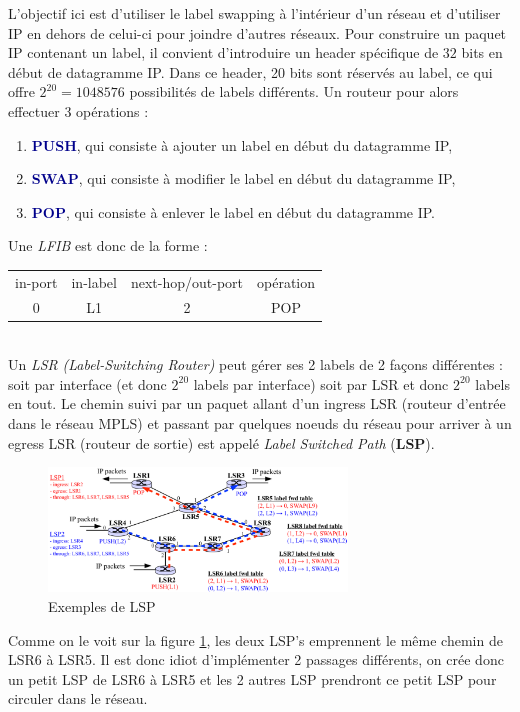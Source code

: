 \documentclass{article}
\newcommand{\blu}[1]{\textcolor{darkblue}{#1}}
\newcommand{\term}[1]{\textit{\textcolor{maintitle}{#1}}}
\begin{document}
\begin{sffamily}
L'objectif ici est d'utiliser le label swapping à l'intérieur d'un réseau et d'utiliser IP en dehors de celui-ci pour joindre 
d'autres réseaux. Pour construire un paquet IP contenant un label, il convient d'introduire un header spécifique de $32$ bits en 
début de datagramme IP. Dans ce header, 20 bits sont réservés au label, ce qui offre $2^{20} = 1048576$ possibilités de labels 
différents. Un routeur pour alors effectuer 3 opérations :
\begin{enumerate}
\item \blu{\textbf{PUSH}}, qui consiste à ajouter un label en début du datagramme IP,
\item \blu{\textbf{SWAP}}, qui consiste à modifier le label en début du datagramme IP,
\item \blu{\textbf{POP}}, qui consiste à enlever le label en début du datagramme IP.
\end{enumerate}
Une \term{LFIB} est donc de la forme :
\begin{tabular}{cccc}
in-port & in-label & next-hop/out-port & opération \\
0 & L1 & 2 & POP
\end{tabular} \\

Un \term{LSR} \textit{(Label-Switching Router)} peut gérer ses 2 labels de 2 façons différentes : soit par interface (et donc 
$2^{20}$ labels par interface) soit par LSR et donc $2^{20}$ labels en tout. Le chemin suivi par un paquet allant d'un ingress 
LSR (routeur d'entrée dans le réseau MPLS) et passant par quelques noeuds du réseau pour arriver à un egress LSR (routeur de 
sortie) est appelé \term{Label Switched Path} (\textbf{LSP}). 

\begin{figure}[h!]
    \begin{center}
    \includegraphics[width=300px]{img_008.pdf}
    \caption{Exemples de LSP}
    \label{lsp1}
    \end{center}	
\end{figure}

Comme on le voit sur la figure \ref{lsp1}, les deux LSP's emprennent le même chemin de LSR6 à LSR5. Il est donc idiot 
d'implémenter 2 passages différents, on crée donc un petit LSP de LSR6 à LSR5 et les 2 autres LSP prendront ce petit LSP pour 
circuler dans le réseau. \\


\end{sffamily}
\end{document}
